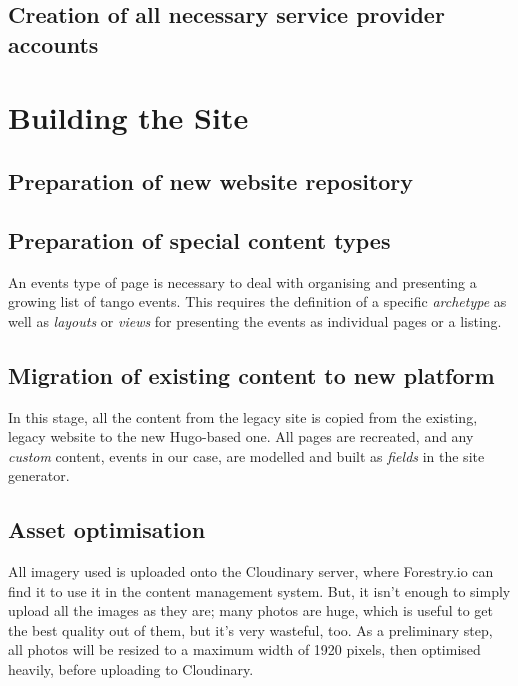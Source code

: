 \documentclass{article}
\begin{document}
\subsection{Creation of all necessary service provider accounts}
\label{sec:org4752663}

\section{Building the Site}
\label{sec:org4ea48d8}

\subsection{Preparation of new website repository}
\label{sec:org52aff36}

\subsection{Preparation of special content types}
\label{sec:org931c2bd}
An events type of page is necessary to deal with organising and presenting a
growing list of tango events. This requires the definition of a specific
\emph{archetype} as well as \emph{layouts} or \emph{views} for presenting the events as
individual pages or a listing.

\subsection{Migration of existing content to new platform}
\label{sec:orgc376395}
In this stage, all the content from the legacy site is copied from the existing,
legacy website to the new Hugo-based one. All pages are recreated, and any
\emph{custom} content, events in our case, are modelled and built as \emph{fields} in the
site generator.

\subsection{Asset optimisation}
\label{sec:orgcf41f84}
All imagery used is uploaded onto the Cloudinary server, where Forestry.io can
find it to use it in the content management system. But, it isn't enough to
simply upload all the images as they are; many photos are huge, which is useful
to get the best quality out of them, but it's very wasteful, too. As a
preliminary step, all photos will be resized to a maximum width of 1920 pixels,
then optimised heavily, before uploading to Cloudinary.
\end{document}

